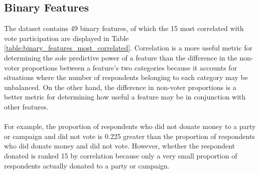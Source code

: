 \documentclass{article}
\begin{document}
	\subsection{Binary Features}
	
	The dataset contains 49 binary features, of which the 15 most correlated with vote participation are displayed in Table \ref{table:binary_features_most_correlated}. Correlation is a more useful metric for determining the sole predictive power of a feature than the difference in the non-voter proportions between a feature's two categories because it accounts for situations where the number of respondents belonging to each category may be unbalanced. On the other hand, the difference in non-voter proportions is a better metric for determining how useful a feature may be in conjunction with other features.
	\\\\
	For example, the proportion of respondents who did not donate money to a party or campaign and did not vote is 0.225 greater than the proportion of respondents who did donate money and did not vote. However, whether the respondent donated is ranked 15 by correlation because only a very small proportion of respondents actually donated to a party or campaign.
	
\end{document}
